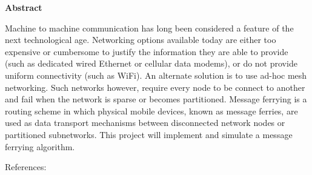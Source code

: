 \begin{center}
\textbf{Abstract}
\end{center}

Machine to machine communication has long been considered a feature of the next technological age. 
Networking options available today are either too expensive or cumbersome to justify the information they are able to provide (such as dedicated wired Ethernet or cellular data modems), or do not provide uniform connectivity (such as WiFi). 
An alternate solution is to use ad-hoc mesh networking. 
Such networks however, require every node to be connect to another and fail when the network is sparse or becomes partitioned.
Message ferrying is a routing scheme in which physical mobile devices, known as message ferries, are used as data transport mechanisms between disconnected network nodes or partitioned subnetworks.
This project will implement and simulate a message ferrying algorithm. 


References: 
~\cite{adhocmsgferry}
~\cite{hybrid}
~\cite{Routing}
~\cite{wearable}
~\cite{QoSrouting}
~\cite{efficientrouting}
~\cite{implement}
~\cite{book1}